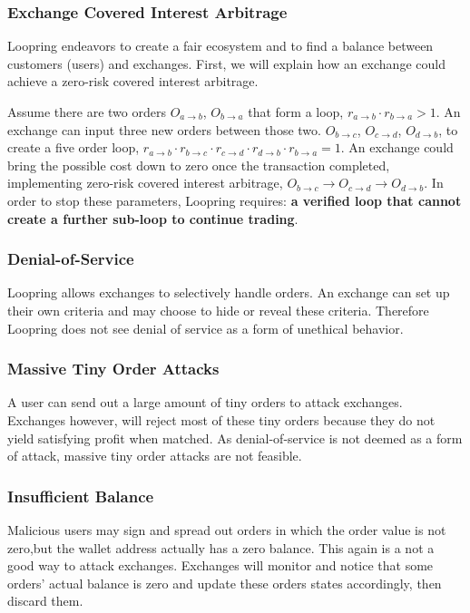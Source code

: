 \documentclass[UTF8,nofonts]{article}
\begin{document}
\subsubsection{Exchange Covered Interest Arbitrage}

Loopring endeavors to create a fair ecosystem and to find a balance between customers (users) and exchanges. First, we will explain how an exchange could achieve a zero-risk covered interest arbitrage.

Assume there are two orders $O_{a\rightarrow b}$, $O_{b\rightarrow a}$ that form a loop, $r_{a\rightarrow b} \cdot r_{b\rightarrow a} > 1$. An exchange can input three new orders between those two. $O_{b\rightarrow c}$, $O_{c\rightarrow d}$, $O_{d\rightarrow b}$, to create a five order loop,  $r_{a\rightarrow b} \cdot r_{b\rightarrow c} \cdot r_{c\rightarrow d}\cdot r_{d\rightarrow b}\cdot r_{b\rightarrow a} = 1$. An exchange could bring the possible cost down to zero once the transaction completed, implementing zero-risk covered interest arbitrage, $O_{b\rightarrow c}\rightarrow O_{c\rightarrow d}\rightarrow O_{d\rightarrow b}$. In order to stop these parameters, Loopring requires: {\bfseries a verified loop that cannot create a further sub-loop to continue trading}.

\subsubsection{Denial-of-Service}

Loopring allows exchanges to selectively handle orders. An exchange can set up their own criteria and may choose to hide or reveal these criteria. Therefore Loopring does not see denial of service as a form of unethical behavior.

\subsubsection{Massive Tiny Order Attacks}
A user can send out a large amount of tiny orders to attack exchanges. Exchanges however, will reject most of these tiny orders because they do not yield satisfying profit when matched. As denial-of-service is not deemed as a form of attack, massive tiny order attacks are not feasible.

\subsubsection{Insufficient Balance}

Malicious users may sign and spread out orders in which the order value is not zero,but the wallet address actually has a zero balance. This again is a not a good way to attack exchanges. Exchanges will monitor and notice that some orders' actual balance is zero and update these orders states accordingly, then discard them.  
\end{document}
